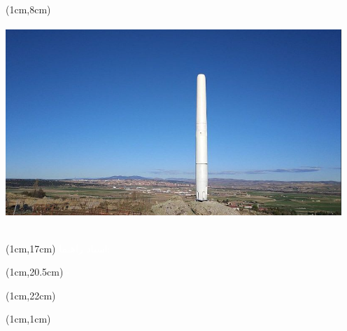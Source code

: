 \begin{textblock*}{12.7cm}(1cm,8cm)
    \includegraphics[width=12.7cm, height=8cm]{assets/cover}
\end{textblock*}

\begin{textblock*}{12.5cm}(1cm,17cm)
    \textcolor{white}{استاد راهنما: \\ \textbf{\PersianSupervisor}}
\end{textblock*}

\begin{textblock*}{12.5cm}(1cm,20.5cm)
    \textcolor{white}{{\PersianSchool} - {\PersianDepartment}}
\end{textblock*}

\begin{textblock*}{2.5cm}(1cm,22cm)
\end{textblock*}

\begin{textblock*}{14.7cm}(1cm,1cm)
\end{textblock*}

\restoregeometry

